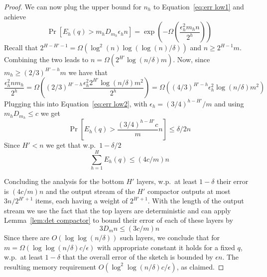 \documentclass[12pt]{colt2019} %
\newcommand{\eps}{\epsilon}
\begin{document}
\begin{proof}
We can now plug the upper bound for $n_h$ to Equation~\ref{eq:err low1} and achieve 
\begin{equation} \label{eq:err low2}
\Pr\left[ E_h(q) > m_h D_{m_h} \eps_h n \right] = \exp \left( -\Omega\left( \frac{\eps_h^2 m_h n}{2^h} \right) \right)
\end{equation}
Recall that $2^{H-H'-1} = \Omega(\log^2(n)\log(\log(n)/\delta))$ and $n \geq 2^{H-1}m$. Combining the two leads to $n = \Omega(2^{H'}\log(n/\delta)m)$. Now, since $m_h \geq (2/3)^{H'-h}m$ we have that
$$
\frac{\eps_h^2 n m_h}{2^h} = \Omega\left( (2/3)^{H'-h} \frac{\eps_h^2 2^{H'} \log(n/\delta) m^2}{2^h} \right) = \Omega\left( (4/3)^{H'-h} \eps_h^2 \log(n/\delta) m^2 \right)
$$
Plugging this into Equation~\eqref{eq:err low2}, with $\eps_h = (3/4)^{h-H'}/m$ and using $m_h D_{m_h} \leq c$ we get
\begin{equation} \label{eq:err low3}
\Pr\left[ E_h(q) > \frac{(3/4)^{h-H'} c}{m} n \right]  \leq \delta/2n
\end{equation}
Since $H' < n$ we get that w.p.\ $1-\delta/2$
$$ \sum_{h=1}^H E_h(q) \leq (4c/m) n $$

Concluding the analysis for the bottom $H'$ layers, w.p.\ at least $1-\delta$ their error is $(4c/m) n$ and the output stream of the $H'$ compactor outputs at most $3n/2^{H'+1}$ items, each having a weight of $2^{H'+1}$. With the length of the output stream we use the fact that the top layers are deterministic and can apply Lemma~\ref{lem:det compactor} to bound their error of each of these layers by
$$ 3D_m n \leq (3c/m) n $$
Since there are $O(\log\log(n/\delta))$ such layers, we conclude that for $m=\Omega(\log\log(n/\delta) c/\eps)$ with appropriate constant it holds for a fixed $q$, w.p.\ at least $1-\delta$ that the overall error of the sketch is bounded by $\eps n$. The resulting memory requirement $O(\log^2\log(n/\delta) c/\eps)$, as claimed.
\end{proof}
\end{document}
